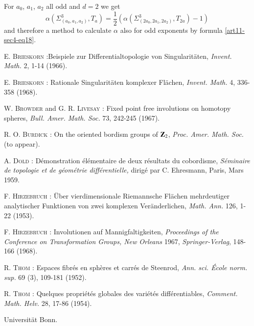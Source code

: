 For $a_{0}$, $a_{1}$, $a_{2}$ all odd and $d=2$ we get
$$
\alpha(\Sigma^{3}_{(a_{0},a_{1},a_{2})},T_{a})=\frac{1}{2}(\alpha(\Sigma^{3}_{(2a_{0},2a_{1},2a_{2})},T_{2a})-1)
$$
and therefore a method to calculate $\alpha$ also for odd exponents by formula \eqref{art11-sec4-eq18}.

\begin{thebibliography}{99}
 \textsc{E. Brieskorn :}\pageoriginale Beispiele zur Differentialtopologie von Singularit\"aten, {\em Invent. Math.} 2, 1-14 (1966).

 \textsc{E. Brieskorn :} Rationale Singularit\"aten komplexer Fl\"achen, {\em Invent. Math.} 4, 336-358 (1968).

 \textsc{W. Browder} and \textsc{G. R. Livesay :} Fixed point free involutions on homotopy spheres, {\em Bull. Amer. Math. Soc.} 73, 242-245 (1967).

 \textsc{R. O. Burdick :} On the oriented bordism groups of $\mathbf{Z}_{2}$, {\em Proc. Amer. Math. Soc.} (to appear).

 \textsc{A. Dold :} D\'emonstration \'el\'ementaire de deux r\'esultats du cobordisme, {\em S\'eminaire de topologie et de g\'eom\'etrie diff\'erentielle,} dirig\'e par C. Ehresmann, Paris, Mars 1959.

 \textsc{F. Hirzebruch :} \"Uber vierdimensionale Riemannsche Fl\"achen mehrdeutiger analytischer Funktionen von zwei komplexen Ver\"anderlichen, {\em Math. Ann.} 126, 1-22 (1953). 

 \textsc{F. Hirzebruch :} Involutionen auf Mannigfaltigkeiten, {\em Proceedings of the Conference on Transformation Groups, New Orleans} 1967, {\em Springer-Verlag}, 148-166 (1968).

 \textsc{R. Thom :} Espaces fibr\'es en sph\`eres et carr\'es de Steenrod, {\em Ann. sci. \'Ecole norm. sup.} 69 (3), 109-181 (1952).

 \textsc{R. Thom :} Quelques propri\'et\'es globales des vari\'et\'es diff\'erentiables, {\em Comment. Math. Helv.} 28, 17-86 (1954).
\end{thebibliography}

\bigskip
\noindent
{\small Universit\"at Bonn.}
